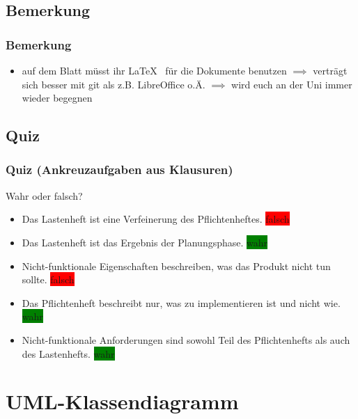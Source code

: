 \documentclass[18pt]{beamer}
\begin{document}
	\subsection{Bemerkung}
	\begin{frame}
		\frametitle{Bemerkung}
		\begin{itemize}
			\item auf dem Blatt müsst ihr \LaTeX  ~ für die Dokumente benutzen \linebreak $\implies$ verträgt sich besser mit git als z.B. LibreOffice o.Ä.
			\linebreak $\implies$ wird euch an der Uni immer wieder begegnen
		\end{itemize}
	\end{frame}
	
	\subsection{Quiz}
	\begin{frame}
		\frametitle{Quiz (Ankreuzaufgaben aus Klausuren)}
		Wahr oder falsch?
		\begin{itemize}
			\item Das Lastenheft ist eine Verfeinerung des Pflichtenheftes. \pause \colorbox{red}{falsch} \pause
			\item Das Lastenheft ist das Ergebnis der Planungsphase. \pause \colorbox{green}{wahr} \pause
			\item Nicht-funktionale Eigenschaften beschreiben, was das Produkt nicht tun sollte. \pause \colorbox{red}{falsch} \pause 
			\item Das Pflichtenheft beschreibt nur, was zu implementieren ist und nicht wie. \pause \colorbox{green}{wahr} \pause 
			\item Nicht-funktionale Anforderungen sind sowohl Teil des Pflichtenhefts als auch des Lastenhefts. \pause \colorbox{green}{wahr}
		\end{itemize}
		
	\end{frame}

\section{UML-Klassendiagramm}
\end{document}
